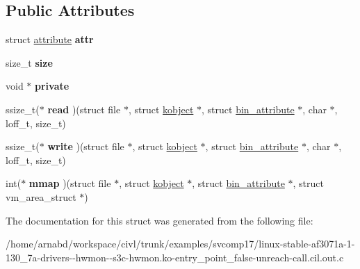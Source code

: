 \subsection*{Public Attributes}
\begin{DoxyCompactItemize}
\item 
\hypertarget{structbin__attribute_aaf36777af1e40f81425400c51ea8e5d8}{}struct \hyperlink{structattribute}{attribute} {\bfseries attr}\label{structbin__attribute_aaf36777af1e40f81425400c51ea8e5d8}

\item 
\hypertarget{structbin__attribute_a91c44f2e6c4bef44699b379a964a4e6c}{}size\+\_\+t {\bfseries size}\label{structbin__attribute_a91c44f2e6c4bef44699b379a964a4e6c}

\item 
\hypertarget{structbin__attribute_a2be01124c184fa6c6f2716438b481add}{}void $\ast$ {\bfseries private}\label{structbin__attribute_a2be01124c184fa6c6f2716438b481add}

\item 
\hypertarget{structbin__attribute_a2b7a73172426e0bd8eb5bbec7da2c14b}{}ssize\+\_\+t($\ast$ {\bfseries read} )(struct file $\ast$, struct \hyperlink{structkobject}{kobject} $\ast$, struct \hyperlink{structbin__attribute}{bin\+\_\+attribute} $\ast$, char $\ast$, loff\+\_\+t, size\+\_\+t)\label{structbin__attribute_a2b7a73172426e0bd8eb5bbec7da2c14b}

\item 
\hypertarget{structbin__attribute_af510399acedd2c40214e172fcbf9b236}{}ssize\+\_\+t($\ast$ {\bfseries write} )(struct file $\ast$, struct \hyperlink{structkobject}{kobject} $\ast$, struct \hyperlink{structbin__attribute}{bin\+\_\+attribute} $\ast$, char $\ast$, loff\+\_\+t, size\+\_\+t)\label{structbin__attribute_af510399acedd2c40214e172fcbf9b236}

\item 
\hypertarget{structbin__attribute_a27046606ce91556380154233ae4c7d2a}{}int($\ast$ {\bfseries mmap} )(struct file $\ast$, struct \hyperlink{structkobject}{kobject} $\ast$, struct \hyperlink{structbin__attribute}{bin\+\_\+attribute} $\ast$, struct vm\+\_\+area\+\_\+struct $\ast$)\label{structbin__attribute_a27046606ce91556380154233ae4c7d2a}

\end{DoxyCompactItemize}


The documentation for this struct was generated from the following file\+:\begin{DoxyCompactItemize}
\item 
/home/arnabd/workspace/civl/trunk/examples/svcomp17/linux-\/stable-\/af3071a-\/1-\/130\+\_\+7a-\/drivers-\/-\/hwmon-\/-\/s3c-\/hwmon.\+ko-\/entry\+\_\+point\+\_\+false-\/unreach-\/call.\+cil.\+out.\+c\end{DoxyCompactItemize}

